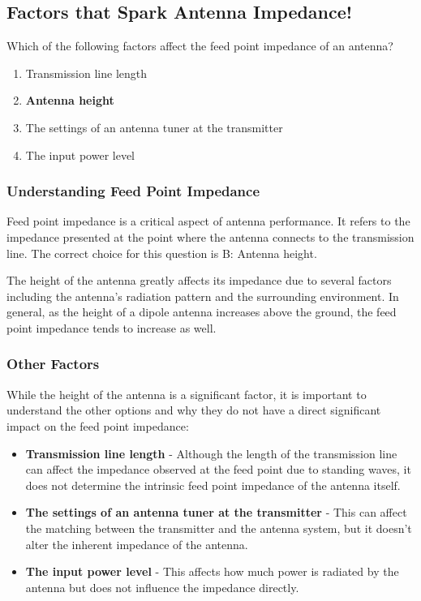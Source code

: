 \subsection{Factors that Spark Antenna Impedance!}

\begin{tcolorbox}[colback=gray!10, colframe=black, title=E9A04]  
Which of the following factors affect the feed point impedance of an antenna?  
\begin{enumerate}[label=\Alph*.]
    \item Transmission line length
    \item \textbf{Antenna height}
    \item The settings of an antenna tuner at the transmitter
    \item The input power level
\end{enumerate} \end{tcolorbox}

\subsubsection{Understanding Feed Point Impedance}

Feed point impedance is a critical aspect of antenna performance. It refers to the impedance presented at the point where the antenna connects to the transmission line. The correct choice for this question is B: Antenna height. 

The height of the antenna greatly affects its impedance due to several factors including the antenna's radiation pattern and the surrounding environment. In general, as the height of a dipole antenna increases above the ground, the feed point impedance tends to increase as well.

\subsubsection{Other Factors}

While the height of the antenna is a significant factor, it is important to understand the other options and why they do not have a direct significant impact on the feed point impedance:

\begin{itemize}
    \item \textbf{Transmission line length} - Although the length of the transmission line can affect the impedance observed at the feed point due to standing waves, it does not determine the intrinsic feed point impedance of the antenna itself.
    \item \textbf{The settings of an antenna tuner at the transmitter} - This can affect the matching between the transmitter and the antenna system, but it doesn't alter the inherent impedance of the antenna.
    \item \textbf{The input power level} - This affects how much power is radiated by the antenna but does not influence the impedance directly.
\end{itemize}

